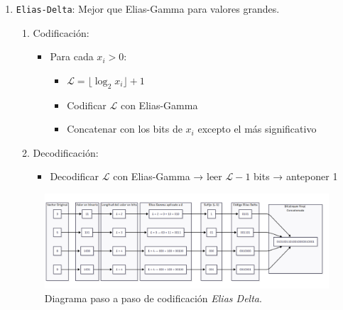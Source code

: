 \begin{enumerate}
\begin{enumerate}
            \item \texttt{Elias-Delta}:
            Mejor que Elias-Gamma para valores grandes.
            \begin{enumerate}
                \item Codificación:
                \begin{itemize}
                    \item Para cada \(x_i > 0\):
                        \begin{itemize}
                            \item \(\mathcal{L} = \lfloor \log_2 x_i \rfloor + 1\)
                            \item Codificar \(\mathcal{L}\) con Elias-Gamma
                            \item Concatenar con los bits de \(x_i\) excepto el más significativo
                        \end{itemize}
                \end{itemize}
                \item Decodificación:
                \begin{itemize}
                    \item Decodificar \(\mathcal{L}\) con Elias-Gamma → leer \(\mathcal{L} - 1\) bits → anteponer 1
                \end{itemize}
            \end{enumerate}
            \begin{figure}[H]
                \centering
                \includegraphics[width=0.9\linewidth]{alternatives/images/enc_vector_elias_delta.png}
                \caption[Ejemplo \textit{Elias Delta}]{Diagrama paso a paso de codificación \textit{Elias Delta}.}
                \label{enc_vector_elias_delta}
            \end{figure}


\end{enumerate}
\end{enumerate}
